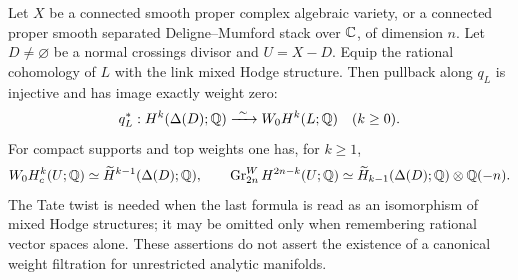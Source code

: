 \begin{theorem}
\label{P4c2}
Let $X$ be a connected smooth proper complex algebraic variety, or a connected proper smooth separated Deligne--Mumford stack over $\mathbb C$, of dimension $n$.  Let $D\ne\varnothing$ be a normal crossings divisor and $U=X-D$.  Equip the rational cohomology of $L$ with the link mixed Hodge structure.  Then pullback along $q_L$ is injective and has image exactly weight zero:
\[
 q_L^*:H^k(\Delta(D);\Q)\xrightarrow{\ \sim\ }W_0H^k(L;\Q)
 \quad(k\ge0).
\]
For compact supports and top weights one has, for $k\ge1$,
\[
 W_0H_c^k(U;\mathbb Q)\simeq\widetilde H^{k-1}(\Delta(D);\mathbb Q),
\qquad
 \operatorname{Gr}^{W}_{2n}H^{2n-k}(U;\mathbb Q)
 \simeq\widetilde H_{k-1}(\Delta(D);\mathbb Q)\otimes\mathbb Q(-n).
\]
The Tate twist is needed when the last formula is read as an isomorphism of mixed Hodge structures; it may be omitted only when remembering rational vector spaces alone.  These assertions do not assert the existence of a canonical weight filtration for unrestricted analytic manifolds.
\end{theorem}
